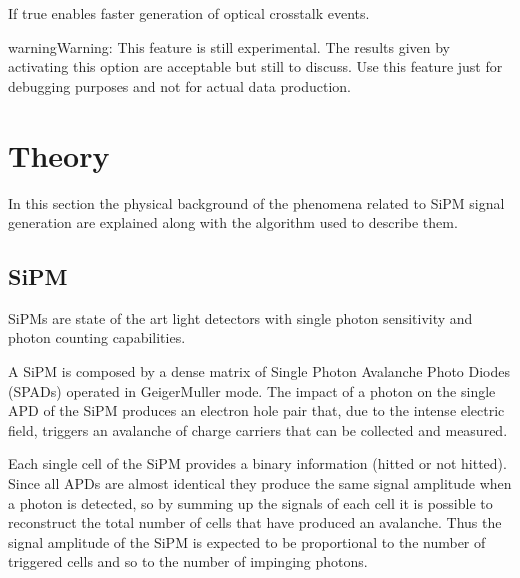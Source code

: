 \documentclass[letterpaper,10pt,english]{sphinxmanual}
\let\sphinxpxdimen\pdfpxdimen\else\newdimen\sphinxpxdimen
\begin{document}
\begin{fulllineitems}
If true enables faster generation of optical crosstalk events.

\begin{sphinxadmonition}{warning}{Warning:}
This feature is still experimental. The results given by activating this option are acceptable but still to discuss.
Use this feature just for debugging purposes and not for actual data production.
\end{sphinxadmonition}

\end{fulllineitems}



\chapter{Theory}
\label{\detokenize{theory:theory}}\label{\detokenize{theory::doc}}
In this section the physical background of the phenomena related to SiPM signal generation are explained along with the algorithm used to describe them.


\section{SiPM}
\label{\detokenize{theory:sipm}}
SiPMs are state of the art light detectors with single photon sensitivity and photon counting capabilities.

A SiPM is composed by a dense matrix of Single Photon Avalanche Photo Diodes (SPADs) operated in Geiger\sphinxhyphen{}Muller mode. The impact of a photon on the single APD of the SiPM produces an electron \sphinxhyphen{} hole pair that, due to the intense electric field, triggers an avalanche of charge carriers that can be collected and measured.

\noindent{\hspace*{\fill}\sphinxincludegraphics[width=250\sphinxpxdimen]{{simpmarray}.jpg}\hspace*{\fill}}

Each single cell of the SiPM provides a binary information (hitted or not hitted). Since all APDs are almost identical they produce the same signal amplitude when a photon is detected, so by summing up the signals of each cell it is possible to reconstruct the total number of cells that have produced an avalanche.
Thus the signal amplitude of the SiPM is expected to be proportional to the number of triggered cells and so to the number of impinging photons.
\end{document}
